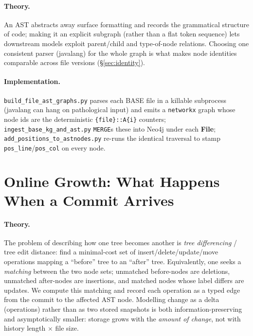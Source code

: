 \documentclass[11pt,a4paper]{article}
\newcommand{\code}[1]{\texttt{#1}}
\newcommand{\node}[1]{\textcolor{kgblue}{\textbf{#1}}}
\begin{document}
\paragraph{Theory.} An AST abstracts away surface formatting and records the
grammatical structure of code; making it an explicit subgraph (rather than a
flat token sequence) lets downstream models exploit parent/child and
type-of-node relations. Choosing one consistent parser (javalang) for the whole
graph is what makes node identities comparable across file versions
(\S\ref{sec:identity}).

\paragraph{Implementation.} \texttt{build\_file\_ast\_graphs.py} parses each
BASE file in a killable subprocess (javalang can hang on pathological input) and
emits a \texttt{networkx} graph whose node ids are the deterministic
\texttt{\{file\}::A\{i\}} counters; \texttt{ingest\_base\_kg\_and\_ast.py}
\texttt{MERGE}s these into Neo4j under each \node{File};
\texttt{add\_positions\_to\_astnodes.py} re-runs the identical traversal to stamp
\code{pos\_line}/\code{pos\_col} on every node.

\section{Online Growth: What Happens When a Commit Arrives}\label{sec:online}
\paragraph{Theory.} The problem of describing how one tree becomes another is
\emph{tree differencing} / tree edit distance: find a minimal-cost set of
insert/delete/update/move operations mapping a ``before'' tree to an ``after''
tree. Equivalently, one seeks a \emph{matching} between the two node sets;
unmatched before-nodes are deletions, unmatched after-nodes are insertions, and
matched nodes whose label differs are updates. We compute this matching and
record each operation as a typed edge from the commit to the affected AST node.
Modelling change as a delta (operations) rather than as two stored snapshots is
both information-preserving and asymptotically smaller: storage grows with the
\emph{amount of change}, not with history length $\times$ file size.
\end{document}
